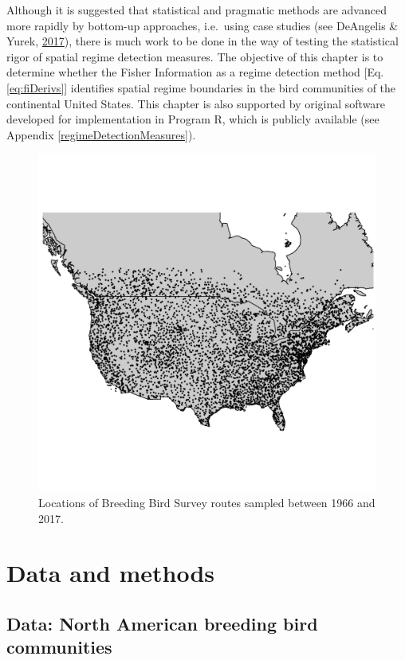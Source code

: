 \documentclass[12pt,twoside,openany]{reedthesis}
\begin{document}
Although it is suggested that statistical and pragmatic methods are advanced more rapidly by bottom-up approaches, i.e.~using case studies (see DeAngelis \& Yurek, \protect\hyperlink{ref-deangelis2017spatially}{2017}), there is much work to be done in the way of testing the statistical rigor of spatial regime detection measures. The objective of this chapter is to determine whether the Fisher Information as a regime detection method {[}Eq. \eqref{eq:fiDerivs}{]} identifies spatial regime boundaries in the bird communities of the continental United States. This chapter is also supported by original software developed for implementation in Program R, which is publicly available (see Appendix \ref{regimeDetectionMeasures}).
\begin{figure}
\includegraphics[width=0.85\linewidth]{./chapterFiles/fisherSpatial/figures/figsCalledInDiss/bbsRoutesUsed} \caption{Locations of Breeding Bird Survey routes sampled between 1966 and 2017.}\label{fig:bbsPoints}
\end{figure}
\hypertarget{data-and-methods}{%
\section{Data and methods}\label{data-and-methods}}

\hypertarget{data-north-american-breeding-bird-communities}{%
\subsection{Data: North American breeding bird communities}\label{data-north-american-breeding-bird-communities}}
\end{document}
